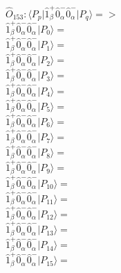 \documentclass[14pt]{article}
\begin{document}
    $\hat{O}_{153}:  \langle{P_p}\vert \hat{1}_{\beta}^{+}\hat{0}_{\alpha}^{-}\hat{0}_{\alpha}^{-} \vert{P_q}\rangle => $ \\ 
    $ \hat{1}_{\beta}^{+}\hat{0}_{\alpha}^{-}\hat{0}_{\alpha}^{-} \vert{P_{0}}\rangle =  $ \\ 
    $ \hat{1}_{\beta}^{+}\hat{0}_{\alpha}^{-}\hat{0}_{\alpha}^{-} \vert{P_{1}}\rangle =  $ \\ 
    $ \hat{1}_{\beta}^{+}\hat{0}_{\alpha}^{-}\hat{0}_{\alpha}^{-} \vert{P_{2}}\rangle =  $ \\ 
    $ \hat{1}_{\beta}^{+}\hat{0}_{\alpha}^{-}\hat{0}_{\alpha}^{-} \vert{P_{3}}\rangle =  $ \\ 
    $ \hat{1}_{\beta}^{+}\hat{0}_{\alpha}^{-}\hat{0}_{\alpha}^{-} \vert{P_{4}}\rangle =  $ \\ 
    $ \hat{1}_{\beta}^{+}\hat{0}_{\alpha}^{-}\hat{0}_{\alpha}^{-} \vert{P_{5}}\rangle =  $ \\ 
    $ \hat{1}_{\beta}^{+}\hat{0}_{\alpha}^{-}\hat{0}_{\alpha}^{-} \vert{P_{6}}\rangle =  $ \\ 
    $ \hat{1}_{\beta}^{+}\hat{0}_{\alpha}^{-}\hat{0}_{\alpha}^{-} \vert{P_{7}}\rangle =  $ \\ 
    $ \hat{1}_{\beta}^{+}\hat{0}_{\alpha}^{-}\hat{0}_{\alpha}^{-} \vert{P_{8}}\rangle =  $ \\ 
    $ \hat{1}_{\beta}^{+}\hat{0}_{\alpha}^{-}\hat{0}_{\alpha}^{-} \vert{P_{9}}\rangle =  $ \\ 
    $ \hat{1}_{\beta}^{+}\hat{0}_{\alpha}^{-}\hat{0}_{\alpha}^{-} \vert{P_{10}}\rangle =  $ \\ 
    $ \hat{1}_{\beta}^{+}\hat{0}_{\alpha}^{-}\hat{0}_{\alpha}^{-} \vert{P_{11}}\rangle =  $ \\ 
    $ \hat{1}_{\beta}^{+}\hat{0}_{\alpha}^{-}\hat{0}_{\alpha}^{-} \vert{P_{12}}\rangle =  $ \\ 
    $ \hat{1}_{\beta}^{+}\hat{0}_{\alpha}^{-}\hat{0}_{\alpha}^{-} \vert{P_{13}}\rangle =  $ \\ 
    $ \hat{1}_{\beta}^{+}\hat{0}_{\alpha}^{-}\hat{0}_{\alpha}^{-} \vert{P_{14}}\rangle =  $ \\ 
    $ \hat{1}_{\beta}^{+}\hat{0}_{\alpha}^{-}\hat{0}_{\alpha}^{-} \vert{P_{15}}\rangle =  $ \\ 
    
\end{document}
